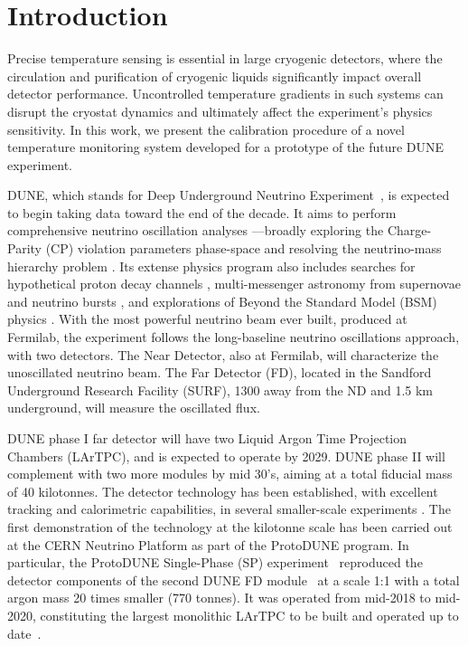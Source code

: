 \section{Introduction}
\label{sec:introduction}

\noindent Precise temperature sensing is essential in large cryogenic detectors, where the circulation and purification of cryogenic liquids significantly impact overall detector performance. Uncontrolled temperature gradients in such systems can disrupt the cryostat dynamics and ultimately affect the experiment's physics sensitivity. In this work, we present the calibration procedure of a novel temperature monitoring system developed for a prototype of the future DUNE experiment.

DUNE, which stands for Deep Underground Neutrino Experiment~\cite{dune_tdr1}, is expected to begin taking data toward the end of the decade. It aims to perform comprehensive neutrino oscillation analyses ---broadly exploring the Charge-Parity (CP) violation parameters phase-space and resolving the neutrino-mass hierarchy problem \cite{bib:dune_osc}. Its extense physics program also includes searches for hypothetical proton decay channels \cite{bib:dune_tdr2}, multi-messenger astronomy from supernovae and neutrino bursts \cite{bib:dune_supernova}, and explorations of Beyond the Standard Model (BSM) physics \cite{bib:dune_bsm}. With the most powerful neutrino beam ever built, produced at Fermilab, the experiment follows the long-baseline neutrino oscillations approach, with two detectors. The Near Detector, also at Fermilab, will characterize the unoscillated neutrino beam. The Far Detector (FD), located in the Sandford Underground Research Facility (SURF), 1300 away from the ND and 1.5 km underground, will measure the oscillated flux.

DUNE phase I far detector will have two Liquid Argon Time Projection Chambers (LArTPC), and is expected to operate by 2029. DUNE phase II will complement with two more modules by mid 30's, aiming at a total fiducial mass of 40 kilotonnes. The detector technology has been established, with excellent tracking and calorimetric capabilities, in several smaller-scale experiments \cite{icarus,microboone}. The first demonstration of the technology at the kilotonne scale has been carried out at the CERN Neutrino Platform as part of the ProtoDUNE program. In particular, the ProtoDUNE Single-Phase (SP) experiment~\cite{pdsp_tdr} reproduced the detector components of the second DUNE FD module~\cite{dune_tdr4} at a scale 1:1 with a total argon mass 20 times smaller (770 tonnes). It was operated from mid-2018 to mid-2020, constituting the largest monolithic LArTPC to be built and operated up to date~\cite{pdsp_1,pdsp_2}.

